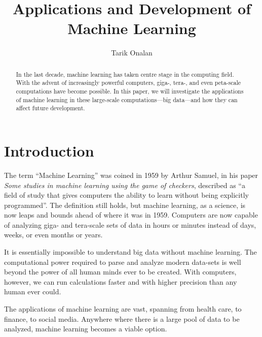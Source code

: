 \documentclass{comjnl}
\numberwithin{equation}{subsection}
\begin{document}
    \title{Applications and Development of Machine Learning}
    \author{Tarik Onalan}


    \begin{abstract}

        In the last decade, machine learning has taken centre stage in the computing field. With the
        advent of increasingly powerful computers, giga-, tera-, and even peta-scale computations have
        become possible. In this paper, we will investigate the applications of machine learning in
        these large-scale computations---big data---and how they can affect future development.

    \end{abstract}

    \maketitle


    \section{Introduction}
        
        The term ``Machine Learning'' was coined in 1959 by Arthur Samuel, in his paper \textit{Some
        studies in machine learning using the game of checkers}, described as ``a field
        of study that gives computers the ability to learn without being explicitly programmed''. The
        definition still holds, but machine learning, as a science, is now leaps and bounds ahead of
        where it was in 1959. Computers are now capable of analyzing giga- and tera-scale sets of data
        in hours or minutes instead of days, weeks, or even months or years.

        It is essentially impossible to understand big data without machine learning. The computational
        power required to parse and analyze modern data-sets is well beyond the power of all human minds
        ever to be created. With computers, however, we can run calculations faster and with higher
        precision than any human ever could.

        The applications of machine learning are vast, spanning from health care, to finance, to social
        media. Anywhere where there is a large pool of data to be analyzed, machine learning becomes a
        viable option.
\end{document}
